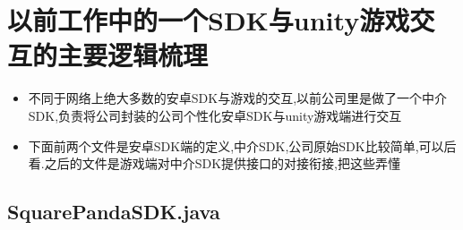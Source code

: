 \documentclass[9pt, b5paper]{article}
\begin{document}
\section{以前工作中的一个SDK与unity游戏交互的主要逻辑梳理}
\label{sec-6}
\begin{itemize}
\item 不同于网络上绝大多数的安卓SDK与游戏的交互,以前公司里是做了一个中介SDK,负责将公司封装的公司个性化安卓SDK与unity游戏端进行交互
\item 下面前两个文件是安卓SDK端的定义,中介SDK,公司原始SDK比较简单,可以后看.之后的文件是游戏端对中介SDK提供接口的对接衔接,把这些弄懂
\end{itemize}
\subsection{SquarePandaSDK.java}
\label{sec-6-1}
\end{document}
